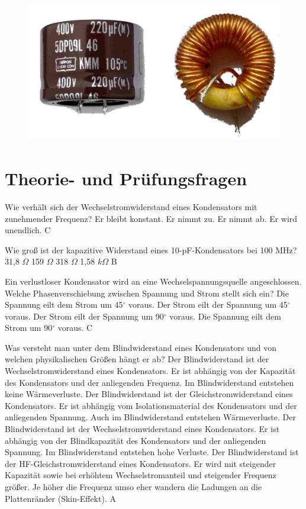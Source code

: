 \begin{figure}
 \vspace{-6cm}
 \includegraphics[scale=0.4]{KondensatorSpule/Bilder/KondensatorSpule.png}
 \vspace{-6cm}
\end{figure}

\section*{Theorie- und Prüfungsfragen} 


{Wie verhält sich der Wechselstromwiderstand eines Kondensators mit zunehmender Frequenz?}%
{Er bleibt konstant.}%
{Er nimmt zu.}%
{Er nimmt ab.}%
{Er wird unendlich.}%
{C}%

{Wie groß ist der kapazitive Widerstand eines 10-pF-Kondensators bei 100 MHz?}%
{31,8 $\Omega$}%
{159 $\Omega$}%
{318 $\Omega$}%
{1,58 $k\Omega$}%
{B}%

{Ein verlustloser Kondensator wird an eine Wechselspannungsquelle angeschlossen. Welche Phasenverschiebung zwischen Spannung und Strom stellt sich ein?}%
{Die Spannung eilt dem Strom um 45$^\circ$ voraus.}%
{Der Strom eilt der Spannung um 45$^\circ$ voraus.}%
{Der Strom eilt der Spannung um 90$^\circ$ voraus.}%
{Die Spannung eilt dem Strom um 90$^\circ$ voraus.
}%
{C}%

{Was versteht man unter dem Blindwiderstand eines Kondensators und von welchen physikalischen Größen hängt er ab?}%
{Der Blindwiderstand ist der Wechselstromwiderstand eines Kondensators. Er ist abhängig von der Kapazität des Kondensators und der anliegenden Frequenz. Im Blindwiderstand entstehen keine Wärmeverluste.}%
{Der Blindwiderstand ist der Gleichstromwiderstand eines Kondensators. Er ist abhängig vom Isolationsmaterial des Kondensators und der anliegenden Spannung. Auch im Blindwiderstand entstehen Wärmeverluste.}%
{Der Blindwiderstand ist der Wechselstromwiderstand eines Kondensators. Er ist abhängig von der Blindkapazität des Kondensators und der anliegenden Spannung. Im Blindwiderstand entstehen hohe Verluste.}%
{Der Blindwiderstand ist der HF-Gleichstromwiderstand eines Kondensators. Er wird mit steigender Kapazität sowie bei erhöhtem Wechselstromanteil und steigender Frequenz größer. Je höher die Frequenz umso eher wandern die Ladungen an die Plattenränder (Skin-Effekt).}%
{A}%


